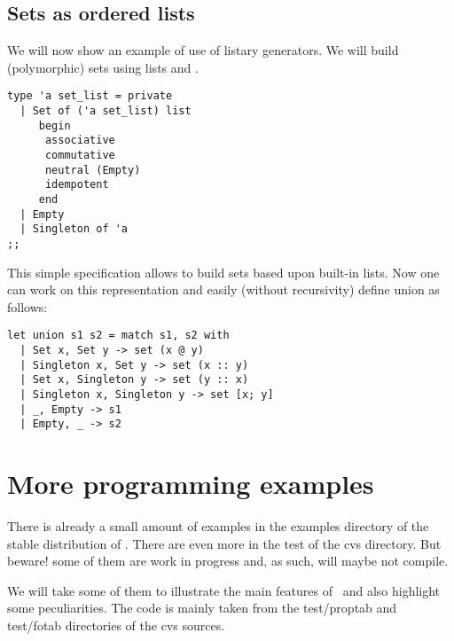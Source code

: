 
\subsection{Sets as ordered lists}
\label{sec:sets_olist}

We will now show an example of use of listary generators. We will build
(polymorphic) sets using \ocaml lists and \moca.

\begin{lstlisting}[caption={Sets as ordered lists}]
  type 'a set_list = private
  | Set of ('a set_list) list
     begin
      associative
      commutative
      neutral (Empty)
      idempotent
     end
  | Empty
  | Singleton of 'a
;;
\end{lstlisting}

This simple specification allows to build sets based upon \ocaml
built-in lists. Now one can work on this representation and easily
(without recursivity) define union as follows:
\begin{verbatim}
let union s1 s2 = match s1, s2 with
  | Set x, Set y -> set (x @ y)
  | Singleton x, Set y -> set (x :: y)
  | Set x, Singleton y -> set (y :: x)
  | Singleton x, Singleton y -> set [x; y]
  | _, Empty -> s1
  | Empty, _ -> s2
\end{verbatim}

\section{More programming examples}
\label{sec:mpex}

There is already a small amount of examples in the {\sf examples}
directory of the stable distribution of \moca. There are even more in
the {\sf test} of the cvs directory. But beware! some of them are work
in progress and, as such, will maybe not compile.

\par We will take some of them to illustrate the main features of
\moca\ and also highlight some peculiarities. The code is mainly taken
from the {\sf test/proptab} and {\sf test/fotab} directories of the
cvs sources.


